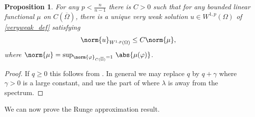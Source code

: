 \documentclass[11pt,a4paper]{amsart}
\newtheorem{Proposition}[Theorem]{Proposition}
\theoremstyle{definition}
\numberwithin{equation}{section}
\newcommand{\ol}[1]{\overline{#1}}
\newcommand{\Om}{\Omega}
\begin{document}
\begin{Proposition} \label{prop_veryweak}
For any $p < \frac{n}{n-1}$ there is $C > 0$ such that for any bounded linear functional $\mu$ on $C(\ol{\Om})$, there is a unique very weak solution $u \in W^{1,p}(\Om)$ of \eqref{veryweak_def} satisfying 
\[
\norm{u}_{W^{1,p}(\Om)} \leq C \norm{\mu},
\]
where $\norm{\mu} = \sup_{\norm{\varphi}_{C(\ol{\Omega})} = 1} \,\abs{\mu(\varphi)}$.
\end{Proposition}
\begin{proof}
If $q \geq 0$ this follows from \cite[Theorem 9.1]{stampacchia}. In general we may replace $q$ by $q+\gamma$ where $\gamma > 0$ is a large constant, and use the part of \cite[Theorem 9.1]{stampacchia} where $\lambda$ is away from the spectrum.
\end{proof}

We can now prove the Runge approximation result.
\end{document}
